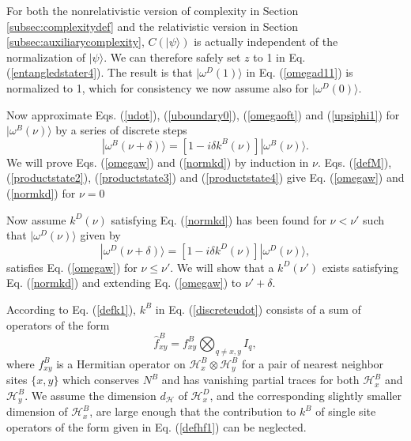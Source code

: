 \documentclass[twocolumn,amsmath,amssymb]{revtex4-1}
\begin{document}
For both the nonrelativistic version of complexity in Section \ref{subsec:complexitydef}
and the relativistic version in Section \ref{subsec:auxiliarycomplexity},
$C( |\psi \rangle )$ is actually independent of the normalization of $|\psi \rangle $. We can therefore
safely set $z$ to 1 in Eq. (\ref{entangledstater4}). The result is that $|\omega^D(1) \rangle $ in
Eq. (\ref{omegad11}) is normalized to 1, which for consistency we now assume
also for $|\omega^D(0) \rangle $.

Now approximate Eqs. (\ref{udot}), (\ref{uboundary0}), (\ref{omegaoft}) and
(\ref{upsiphi1}) for $|\omega^B(\nu) \rangle $
by a series of discrete steps
\begin{equation}
  \label{discreteudot}
  |\omega^B( \nu + \delta) \rangle  = [1 -i\delta k^B( \nu)] |\omega^B( \nu) \rangle .
\end{equation}
We will prove Eqs. (\ref{omegaw}) and (\ref{normkd}) by induction in $\nu$.
Eqs. (\ref{defM}), (\ref{productstate2}), (\ref{productstate3}) and
(\ref{productstate4}) give Eq. (\ref{omegaw}) and (\ref{normkd}) for $\nu = 0$

Now assume $k^D( \nu)$ satisfying Eq. (\ref{normkd})
has been found for $\nu < \nu'$ such that
$|\omega^D(\nu) \rangle $ given by
\begin{equation}
  \label{discreteudotd}
  |\omega^D( \nu + \delta) \rangle  = [1 -i\delta k^D( \nu)] |\omega^D( \nu) \rangle ,
\end{equation}
satisfies Eq. (\ref{omegaw}) for $\nu \le \nu'$.
We will show that a $k^D( \nu')$ exists satisfying Eq. (\ref{normkd}) and
extending Eq. (\ref{omegaw}) to $\nu' + \delta$.

According to Eq. (\ref{defk1}), $k^B$ in Eq. (\ref{discreteudot}) 
consists of a sum of operators
of the form
\begin{equation}
\label{defhf3}
\hat{ f}^B_{xy} =  f^B_{xy} \bigotimes_{q \ne x,y} I_q, 
\end{equation}
where $f^B_{xy}$ is a Hermitian operator on
$\mathcal{H}^B_x \otimes \mathcal{H}^B_y$ for a pair of nearest neighbor sites
$\{x,y\}$ which conserves $N^B$ and has vanishing partial traces
for both $\mathcal{H}^B_x$ and $\mathcal{H}^B_y$.
We  assume the dimension $d_\mathcal{H}$ of $\mathcal{H}^D_x$,
and the corresponding slightly smaller dimension of $\mathcal{H}^B_x$,
are large enough that the contribution
to $k^B$ of single site operators of the form
given in Eq. (\ref{defhf1}) can
be neglected.
\end{document}
